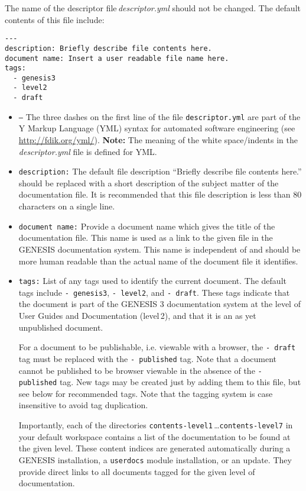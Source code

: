 \documentclass[12pt]{article}
\begin{document}
The name of the descriptor file\,{\it descriptor.yml} should not be changed. The default contents of this file include:

\begin{verbatim}
---
description: Briefly describe file contents here. 
document name: Insert a user readable file name here.  
tags:
  - genesis3
  - level2
  - draft
\end{verbatim}

\begin{itemize}

\item {\tt ---} The three dashes on the first line of the file {\tt descriptor.yml} are part of the Y Markup Language (YML) syntax for automated software engineering (see \href{http://fdik.org/yml/}{http://fdik.org/yml/}). {\bf Note:} The meaning of the white space/indents in the\,{\it descriptor.yml} file is defined for YML.  

\item {\tt description:} The default file description ``Briefly describe file contents here.'' should be replaced with a short description of the subject matter of the documentation file. It is recommended that this file description is less than 80 characters on a single line.

\item {\tt document name:} Provide a document name which gives the title of the documentation file. This name is used as a link to the given file in the GENESIS documentation system. This name is independent of and should be more human readable than the actual name of the document file it identifies.

\item {\tt tags:} List of any tags used to identify the current document. The default tags include {\tt -\,genesis3}, {\tt -\,level2}, and {\tt -\,draft}. These tags indicate that the document is part of the GENESIS 3 documentation system at the level of User Guides and Documentation (level\,2), and that it is an as yet unpublished document.

For a document to be publishable, i.e. viewable with a browser, the {\tt -\,draft} tag must be replaced with the {\tt -\,published} tag. Note that a document cannot be published to be browser viewable in the absence of the {\tt -\,published} tag. New tags may be created just by adding them to this file, but see below for recommended tags.  Note that the tagging system is case insensitive to avoid tag duplication.

Importantly, each of the directories {\tt contents-level1}\,\ldots {\tt contents-level7} in your default workspace contains a list of the documentation to be found at the given level. These content indices are generated automatically during a GENESIS installation, a {\tt userdocs} module installation, or an update. They provide direct links to all documents tagged for the given level of documentation.

\end{itemize}
\end{document}
